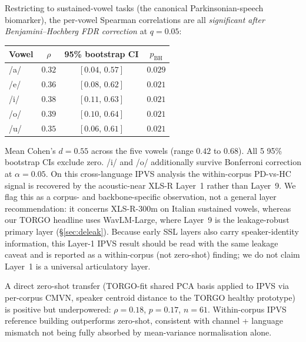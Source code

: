 Restricting to sustained-vowel tasks (the canonical Parkinsonian-speech
biomarker), the per-vowel Spearman correlations are all
\emph{significant after Benjamini--Hochberg FDR correction} at
$q = 0.05$:

\begin{tabular}{lccc}
\toprule
Vowel & $\rho$ & 95\% bootstrap CI & $p_\mathrm{BH}$ \\
\midrule
/a/ & $0.32$ & $[0.04,\,0.57]$ & $0.029$ \\
/e/ & $0.36$ & $[0.08,\,0.62]$ & $0.021$ \\
/i/ & $0.38$ & $[0.11,\,0.63]$ & $0.021$ \\
/o/ & $0.39$ & $[0.10,\,0.64]$ & $0.021$ \\
/u/ & $0.35$ & $[0.06,\,0.61]$ & $0.021$ \\
\bottomrule
\end{tabular}

Mean Cohen's $d{=}0.55$ across the five vowels (range $0.42$ to $0.68$).
All 5 95\% bootstrap CIs exclude zero. /i/ and /o/ additionally survive
Bonferroni correction at $\alpha = 0.05$. On this cross-language IPVS
analysis the within-corpus PD-vs-HC signal is recovered by the
acoustic-near XLS-R Layer~1 rather than Layer~9. We flag this as a
corpus- and backbone-specific observation, not a general layer
recommendation: it concerns XLS-R-300m on Italian sustained vowels,
whereas our TORGO headline uses WavLM-Large, where Layer~9 is the
leakage-robust primary layer (\S\ref{sec:deleak}). Because early SSL
layers also carry speaker-identity information, this Layer-1 IPVS result
should be read with the same leakage caveat and is reported as a
within-corpus (not zero-shot) finding; we do not claim Layer~1 is a
universal articulatory layer.

A direct zero-shot transfer (TORGO-fit shared PCA basis applied to
IPVS via per-corpus CMVN, speaker centroid distance to the TORGO
healthy prototype) is positive but underpowered: $\rho{=}0.18$,
$p{=}0.17$, $n{=}61$. Within-corpus IPVS reference building
outperforms zero-shot, consistent with channel + language mismatch
not being fully absorbed by mean-variance normalisation alone.

